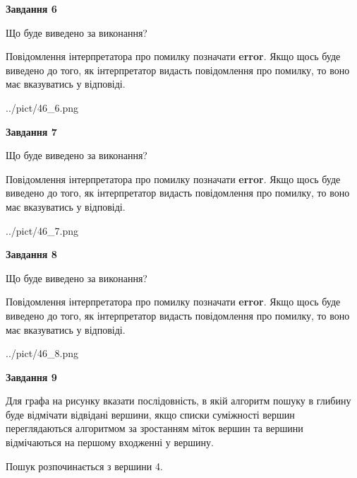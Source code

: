 \documentclass[12pt, ukrainian]{article}
\begin{document}
{\begin {large}
{\begin {center}\textbf{Завдання 6}\end {center}}\par
Що буде виведено за виконання?

Повідомлення інтерпретатора про помилку позначати \textbf{error}.
Якщо щось буде виведено до того, як інтерпретатор видасть повідомлення про помилку, 
то воно має вказуватись у відповіді. \par


\begin{center}
	{../pict/46_6.png}
\end{center}
\newpage

{\begin {center}\textbf{Завдання 7}\end {center}}\par
Що буде виведено за виконання?

Повідомлення інтерпретатора про помилку позначати \textbf{error}.
Якщо щось буде виведено до того, як інтерпретатор видасть повідомлення про помилку, 
то воно має вказуватись у відповіді. \par


\begin{center}
	{../pict/46_7.png}
\end{center}
\newpage

{\begin {center}\textbf{Завдання 8}\end {center}}\par
Що буде виведено за виконання?

Повідомлення інтерпретатора про помилку позначати \textbf{error}.
Якщо щось буде виведено до того, як інтерпретатор видасть повідомлення про помилку, 
то воно має вказуватись у відповіді. \par


\begin{center}
	{../pict/46_8.png}
\end{center}
\newpage

{\begin {center}\textbf{Завдання 9}\end {center}}\par
Для графа на рисунку вказати послідовність, в якій алгоритм пошуку в глибину буде відмічати відвідані вершини, якщо списки суміжності вершин переглядаються алгоритмом за зростанням міток вершин та вершини відмічаються на першому вход\-женні у вершину.\par
Пошук розпочинається з вершини 4.\par


\end{large}}
\end{document}
